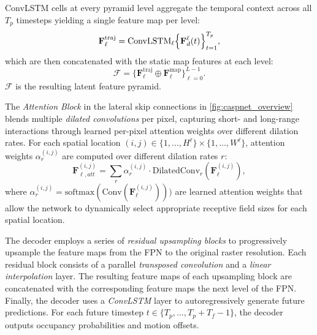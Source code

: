 \begin{description}[leftmargin=1em,itemsep=2pt]
\item[Temporal fusion.] ConvLSTM cells at every pyramid level aggregate the temporal context across all \(T_p\) timesteps yielding a single feature map per level:
\begin{equation}
\label{eq:fpn_fusion_traj}
\mathbf{F}_{\ell}^{\mathrm{traj}}
= \mathrm{ConvLSTM}_\ell\Bigl\{\mathbf{F}^{\ell}_{d}(t)\Bigr\}_{t=1}^{T_p},
\end{equation}
which are then concatenated with the static map features at each level:
\begin{equation}
\label{eq:fpn_fusion}
\boldsymbol{\mathcal{F}}=\{\mathbf{F}_\ell^{\mathrm{traj}}\oplus \mathbf{F}_\ell^{\mathrm{map}}\}_{\ell=0}^{L-1}.
\end{equation}
\( \boldsymbol{\mathcal{F}} \) is the resulting latent feature pyramid.

\item[Pixel-adaptive attention.] The \emph{Attention Block} in the lateral skip connections in \autoref{fig:caspnet_overview} blends multiple \emph{dilated convolutions}\cite{dilatedConv21} per pixel, capturing short- and long-range interactions through learned per-pixel attention weights over different dilation rates. For each spatial location \((i,j) \in \{1,\dots,H^{\ell}\} \times \{1,\dots,W^{\ell}\}\), attention weights \(\alpha^{(i,j)}_{r}\) are computed over different dilation rates \( r \):
\begin{equation}
\label{eq:pixel_attention}
\mathbf{F}_{\ell, att}^{(i,j)} = \sum_{r} \alpha^{(i,j)}_{r} \cdot \text{DilatedConv}_r(\mathbf{F}^{(i,j)}_{\ell}),
\end{equation}
where \(\alpha^{(i,j)}_{r} = \text{softmax}(\text{Conv}(\mathbf{F}^{(i,j)}_{\ell})))\) are learned attention weights that allow the network to dynamically select appropriate receptive field sizes for each spatial location.

\item[Grid-based decoder.] The decoder employs a series of \emph{residual upsampling blocks} to progressively upsample the feature maps from the FPN to the original raster resolution. Each residual block consists of a parallel \emph{transposed convolution} and a \emph{linear interpolation} layer. The resulting feature maps of each upsampling block are concatenated with the corresponding feature maps the next level of the FPN.\\
Finally, the decoder uses a \emph{ConvLSTM} layer to autoregressively generate future predictions. For each future timestep \(t \in \{T_p, \ldots, T_p + T_f - 1\}\), the decoder outputs occupancy probabilities and motion offsets.


\end{description}

